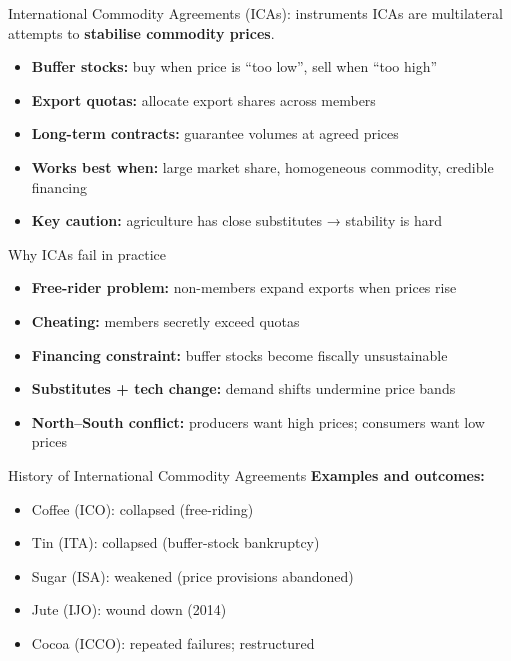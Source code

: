 \documentclass[
  ignorenonframetext,
  aspectratio=169,
]{beamer}
\makeatletter
\providecommand{\tightlist}{%
  \setlength{\itemsep}{0pt}\setlength{\parskip}{0pt}}
\let\quarto@originallabel\label
\DeclareRobustCommand*{\label}[1]{\quarto@originallabel{#1}}
\makeatother
\begin{document}
\begin{frame}{International Commodity Agreements (ICAs): instruments}
\label{international-commodity-agreements-icas-instruments}
ICAs are multilateral attempts to \textbf{stabilise commodity prices}.

\begin{itemize}
\tightlist
\item
  \textbf{Buffer stocks:} buy when price is ``too low'', sell when ``too
  high''
\item
  \textbf{Export quotas:} allocate export shares across members
\item
  \textbf{Long-term contracts:} guarantee volumes at agreed prices
\item
  \textbf{Works best when:} large market share, homogeneous commodity,
  credible financing
\item
  \textbf{Key caution:} agriculture has close substitutes → stability is
  hard
\end{itemize}
\end{frame}

\begin{frame}{Why ICAs fail in practice}
\label{why-icas-fail-in-practice}
\begin{itemize}
\tightlist
\item
  \textbf{Free-rider problem:} non-members expand exports when prices
  rise
\item
  \textbf{Cheating:} members secretly exceed quotas
\item
  \textbf{Financing constraint:} buffer stocks become fiscally
  unsustainable
\item
  \textbf{Substitutes + tech change:} demand shifts undermine price
  bands
\item
  \textbf{North--South conflict:} producers want high prices; consumers
  want low prices
\end{itemize}

\end{frame}

\begin{frame}{History of International Commodity Agreements}
\label{history-of-international-commodity-agreements}
\textbf{Examples and outcomes:}

\begin{itemize}
\tightlist
\item
  Coffee (ICO): collapsed (free-riding)
\item
  Tin (ITA): collapsed (buffer-stock bankruptcy)
\item
  Sugar (ISA): weakened (price provisions abandoned)
\item
  Jute (IJO): wound down (2014)
\item
  Cocoa (ICCO): repeated failures; restructured
\end{itemize}
\end{frame}
\end{document}
